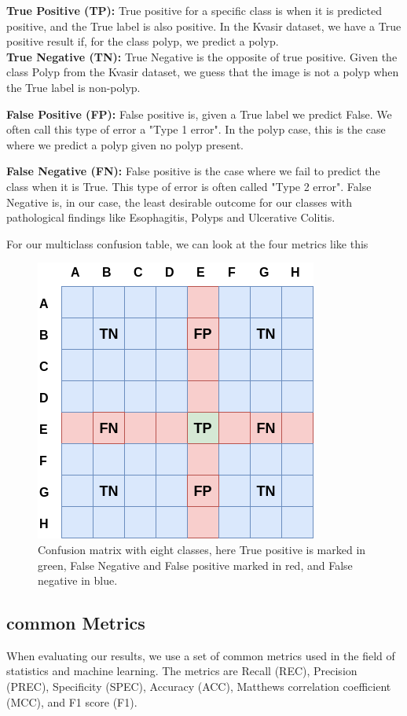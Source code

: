 \textbf{True Positive (TP): } True positive for a specific class is when it is predicted positive, and the True label is also positive.  In the Kvasir dataset, we have a True positive result if, for the class polyp, we predict a polyp.\\

\textbf{True Negative (TN): } True Negative is the opposite of true positive. Given the class Polyp from the Kvasir dataset, we guess that the image is not a polyp when the True label is non-polyp. 

\textbf{False Positive (FP): } False positive is, given a True label we predict False. We often call this type of error a "Type 1 error".   In the polyp case, this is the case where we predict a polyp given no polyp present.


\textbf{False Negative (FN): } False positive is the case where we fail to predict the class when it is True. This type of error is often called "Type 2 error". False Negative is, in our case, the least desirable outcome for our classes with pathological findings like Esophagitis, Polyps and Ulcerative Colitis.

For our multiclass confusion table, we can look at the four metrics like this
\begin{figure}[h]
\centering
\includegraphics[scale=0.7]{experiments/figures/confusionmatrix.png}
\caption{
Confusion matrix with eight classes, here True positive is marked in green, False Negative and False positive marked in red, and False negative in blue.
}
\label{fig:confusionmatrix}
\end{figure}


\subsection{common Metrics}
When evaluating our results, we use a set of common metrics used in the field of statistics and machine learning.  The metrics are Recall (REC), Precision (PREC), Specificity (SPEC), Accuracy (ACC), Matthews correlation coefficient (MCC), and F1 score (F1). 



